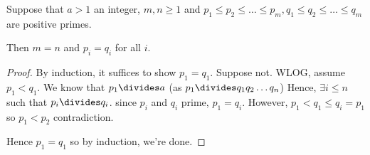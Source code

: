\documentclass[notes.tex]{subfiles}
\begin{document}
\begin{theorem} 
	Suppose that $a > 1$ an integer, $m, n \ge 1$ and $p_1 \le p_2 \le \ldots \le p_m,  q_1 \le q_2\le \ldots \le q_m$ are positive primes.
\end{theorem} 

Then $m=n$ and $p_i=q_i$ for all $i$. 
\begin{proof}
	By induction, it suffices to show $p_1 = q_1$. Suppose not.
WLOG, assume $p_1 < q_1$. We know that $p_1\divides a$ (as $p_1\divides q_1q_2\ldots q_n$) Hence, $\exists i\le n$ such that $p_i \divides q_i$. since $p_i$ and $q_i$ prime, $p_1 = q_i$. However, $p_1 < q_1 \le q_i = p_1$ so $p_1 < p_2$ contradiction.

Hence $p_1 = q_1$ so by induction, we're done.
\end{proof}
\end{document}
